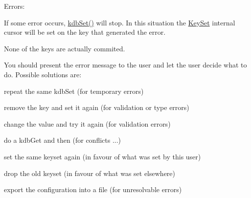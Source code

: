 \begin{DoxyParagraph}{Errors\-:}

\end{DoxyParagraph}
If some error occurs, \hyperlink{group__kdb_ga11436b058408f83d303ca5e996832bcf}{kdb\-Set()} will stop. In this situation the \hyperlink{classkdb_1_1KeySet}{Key\-Set} internal cursor will be set on the key that generated the error.

None of the keys are actually commited.

You should present the error message to the user and let the user decide what to do. Possible solutions are\-:
\begin{DoxyItemize}
\item repeat the same kdb\-Set (for temporary errors)
\item remove the key and set it again (for validation or type errors)
\item change the value and try it again (for validation errors)
\item do a kdb\-Get and then (for conflicts ...)
\begin{DoxyItemize}
\item set the same keyset again (in favour of what was set by this user)
\item drop the old keyset (in favour of what was set elsewhere)
\end{DoxyItemize}
\item export the configuration into a file (for unresolvable errors)
\end{DoxyItemize}

